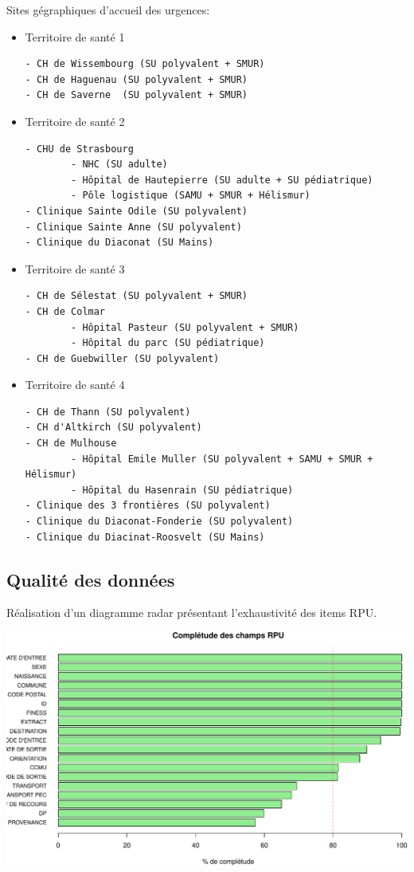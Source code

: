 \documentclass[]{article}
\begin{document}
Sites gégraphiques d'accueil des urgences:

\begin{itemize}
\item
  Territoire de santé 1

\begin{verbatim}
- CH de Wissembourg (SU polyvalent + SMUR)
- CH de Haguenau (SU polyvalent + SMUR)
- CH de Saverne  (SU polyvalent + SMUR)
\end{verbatim}
\item
  Territoire de santé 2

\begin{verbatim}
- CHU de Strasbourg
        - NHC (SU adulte)
        - Hôpital de Hautepierre (SU adulte + SU pédiatrique)
        - Pôle logistique (SAMU + SMUR + Hélismur)
- Clinique Sainte Odile (SU polyvalent)
- Clinique Sainte Anne (SU polyvalent)
- Clinique du Diaconat (SU Mains)
\end{verbatim}
\item
  Territoire de santé 3

\begin{verbatim}
- CH de Sélestat (SU polyvalent + SMUR)
- CH de Colmar 
        - Hôpital Pasteur (SU polyvalent + SMUR)
        - Hôpital du parc (SU pédiatrique)
- CH de Guebwiller (SU polyvalent)
\end{verbatim}
\item
  Territoire de santé 4

\begin{verbatim}
- CH de Thann (SU polyvalent)
- CH d'Altkirch (SU polyvalent)
- CH de Mulhouse
        - Hôpital Emile Muller (SU polyvalent + SAMU + SMUR + Hélismur)
        - Hôpital du Hasenrain (SU pédiatrique)
- Clinique des 3 frontières (SU polyvalent)
- Clinique du Diaconat-Fonderie (SU polyvalent)
- Clinique du Diacinat-Roosvelt (SU Mains)
\end{verbatim}
\end{itemize}

\subsection{Qualité des données}\label{qualite-des-donnees}

Réalisation d'un diagramme radar présentant l'exhaustivité des items
RPU.

\includegraphics{rapport2014_V4_files/figure-latex/completude-1.pdf}
\end{document}
